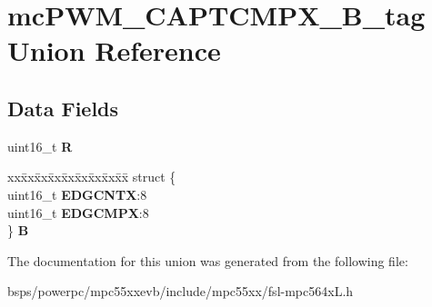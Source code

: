 \hypertarget{unionmcPWM__CAPTCMPX__16B__tag}{}\section{mc\+P\+W\+M\+\_\+\+C\+A\+P\+T\+C\+M\+P\+X\+\_\+B\+\_\+tag Union Reference}
\label{unionmcPWM__CAPTCMPX__16B__tag}
\subsection*{Data Fields}
\begin{DoxyCompactItemize}
\item 
\mbox{\label{unionmcPWM__CAPTCMPX__16B__tag_abf70d6ec9942d2fa8874b4402f5de6a9}} 
uint16\+\_\+t {\bfseries R}
\item 
\mbox{\label{unionmcPWM__CAPTCMPX__16B__tag_a845ac39d407a433ef615d3dadb806d05}} 
\begin{tabbing}
xx\=xx\=xx\=xx\=xx\=xx\=xx\=xx\=xx\=\kill
struct \{\\
\>uint16\_t {\bfseries EDGCNTX}:8\\
\>uint16\_t {\bfseries EDGCMPX}:8\\
\} {\bfseries B}\\

\end{tabbing}\end{DoxyCompactItemize}


The documentation for this union was generated from the following file\+:\begin{DoxyCompactItemize}
\item 
bsps/powerpc/mpc55xxevb/include/mpc55xx/fsl-\/mpc564x\+L.\+h\end{DoxyCompactItemize}
